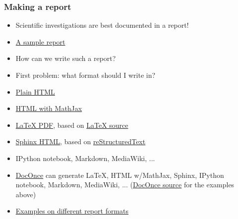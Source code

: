 \documentclass{beamer}
\newcounter{doconce:movie:counter}
\begin{document}
\begin{frame}
\frametitle{Making a report}

\label{decay:exper:report}

\begin{itemize}
 \item Scientific investigations are best documented in a report!

 \item \href{{http://hplgit.github.com/INF5620/doc/writing_reports/sphinx-cloud/}}{A sample report}

 \item How can we write such a report?

 \item First problem: what format should I write in?

 \item \href{{http://tinyurl.com/nc4upel/_static/report_html.html}}{Plain HTML}

 \item \href{{http://tinyurl.com/nc4upel/_static/report_html_mathjax.html}}{HTML with MathJax}

 \item \href{{http://tinyurl.com/nc4upel/_static/report.pdf}}{LaTeX PDF}, based on \href{{http://tinyurl.com/nc4upel/_static/report.tex.html}}{LaTeX source}

 \item \href{{http://tinyurl.com/nc4upel/_static/sphinx-cloud/index.html}}{Sphinx HTML}, based on \href{{http://tinyurl.com/nc4upel/_static/report_sphinx.rst.html}}{reStructuredText}

 \item IPython notebook, Markdown, MediaWiki, ...

 \item \href{{https://github.com/hplgit/doconce}}{DocOnce} can generate {\LaTeX}, HTML w/MathJax, Sphinx, IPython notebook, Markdown, MediaWiki, ... (\href{{http://tinyurl.com/nc4upel/_static/report.do.txt.html}}{DocOnce source} for the examples above)

 \item \href{{http://hplgit.github.com/INF5620/doc/writing_reports/}}{Examples on different report formats}
\end{itemize}

\noindent
\end{frame}
\end{document}
